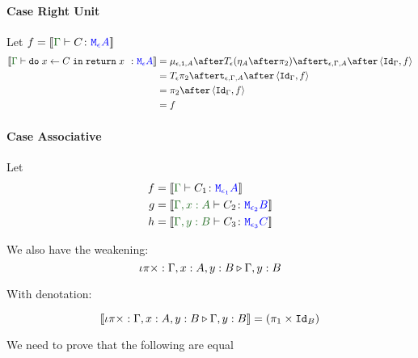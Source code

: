 {\paragraph{Case Right Unit}

Let $f = \deno{\gtyperelation{C}{\mea}}$ 
    \begin{equation}
    \begin{split}
        \deno{\gtyperelation{\doin{x}{C}{\return{x}}}{\mea}}  & = \bind{\e}{\1}{A} \after \T{\e}{(\point{A} \after \pp)} \after \tstrength{\e}{\G}{A}\after \pr{\idg}{f} \\
        & = \T{\e}{\pp} \after \tstrength{\e}{\G}{A} \after \pr {\idg}{f} \\
        & = \pp \after \pr{\idg}{f}\\
        & = f
    \end{split}
\end{equation}



\paragraph{Case Associative}
Let
\begin{align}
    f ={}& \deno{\gtyperelation{C_1}{\M{\e_1}{A}}}\\
    g ={}& \deno{\typerelation{\gax}{C_2}{\M{\e_2}{B}}}\\
    h ={}& \deno{\typerelation{\gby}{C_3}{\M{\e_3}{C}}}
\end{align}

We also have the weakening:
\begin{equation}
    \iota\pi\times : \Gamma, x: A, y: B \triangleright \Gamma, y: B
\end{equation}

With denotation:

\begin{equation}
    {\bf [\![}\iota\pi\times : \Gamma, x: A, y: B \triangleright \Gamma, y: B{\bf ]\!]} = (\pi_1 \times \texttt{Id}_{B})
\end{equation}

We need to prove that the following are equal

}
